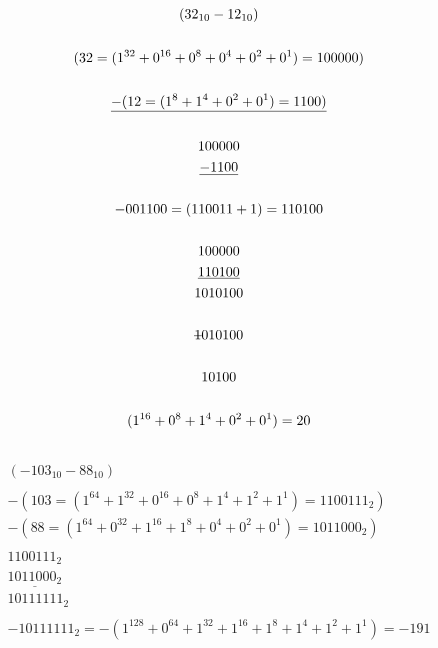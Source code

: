 \documentclass[12pt]{article}
\begin{document}
\subsection{}
\begin{gather*}
(32_{10} - 12_{10}) \\ \\
	(32 = (1^{32} + 0^{16} + 0^8 + 0^4 + 0^2 + 0^1) = 100000) \\ \\
	\underline{-(12 = (1^8 + 1^4 + 0^2 + 0^1) = 1100)} \\ \\
	100000 \\ \underline{-1100} \\ \\
	-001100 = (110011 + 1) = 110100 \\ \\
	100000 \\ \underline{110100} \\ 1010100 \\ \\
	\text{\sout{1}010100} \\ \\
	10100 \\ \\
	(1^{16} + 0^8 + 1^4 + 0^2 + 0^1) = 20
	\end{gather*}
\subsection{}
\begin{gather*}
(-103_{10}- 88_{10})\\ \\-(103 = (1^{64} + 1^{32} + 0^{16} + 0^8 + 1^4 + 1^2 + 1^1) = 1100111_2) \\-(88 = (1^{64} + 0^{32} + 1^{16} + 1^8 + 0^4 + 0^2 + 0^1) = 1011000_2)\\ \\1100111_2 \\\underline{1011000_2}\\ 10111111_2 \\ \\
	-10111111_2 = -(1^{128} + 0^{64} + 1^{32} + 1^{16} + 1^8 + 1^4 + 1^2 + 1^1) = -191
\end{gather*}
\end{document}
